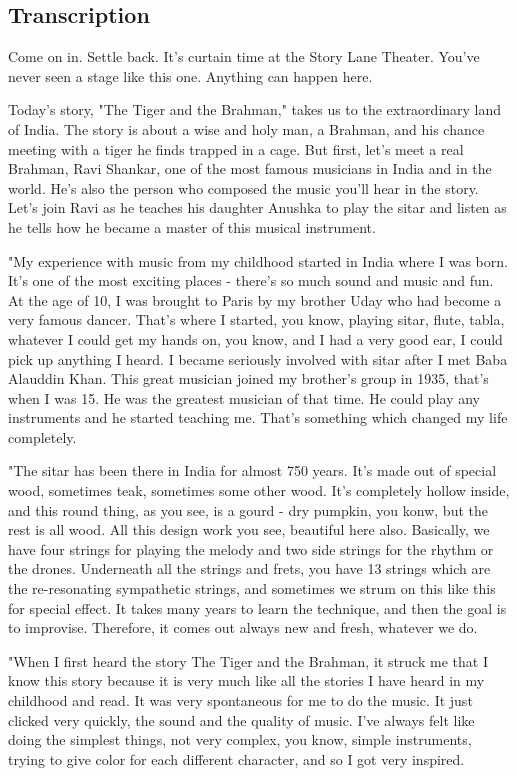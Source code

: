\subsection{Transcription}

Come on in. Settle back. It's curtain time at the Story Lane Theater. You've never seen a stage like this one. Anything can happen here.

Today's story, "The Tiger and the Brahman," takes us to the extraordinary land of India. The story is about a wise and holy man, a Brahman, and his chance meeting with a tiger he finds trapped in a cage. But first, let's meet a real Brahman, Ravi Shankar, one of the most famous musicians in India and in the world. He's also the person who composed the music you'll hear in the story. Let's join Ravi as he teaches his daughter Anushka to play the sitar and listen as he tells how he became a master of this musical instrument.

"My experience with music from my childhood started in India where I was born. It's one of the most exciting places - there's so much sound and music and fun. At the age of 10, I was brought to Paris by my brother Uday who had become a very famous dancer. That's where I started, you know, playing sitar, flute, tabla, whatever I could get my hands on, you know, and I had a very good ear, I could pick up anything I heard. I became seriously involved with sitar after I met Baba Alauddin Khan. This great musician joined my brother's group in 1935, that's when I was 15. He was the greatest musician of that time. He could play any instruments and he started teaching me. That's something which changed my life completely.

"The sitar has been there in India for almost 750 years. It's made out of special wood, sometimes teak, sometimes some other wood. It's completely hollow inside, and this round thing, as you see, is a gourd - dry pumpkin, you konw, but the rest is all wood. All this design work you see, beautiful here also. Basically, we have four strings for playing the melody and two side strings for the rhythm or the drones. Underneath all the strings and frets, you have 13 strings which are the re-resonating sympathetic strings, and sometimes we strum on this like this for special effect. It takes many years to learn the technique, and then the goal is to improvise. Therefore, it comes out always new and fresh, whatever we do.

"When I first heard the story The Tiger and the Brahman, it struck me that I know this story because it is very much like all the stories I have heard in my childhood and read. It was very spontaneous for me to do the music. It just clicked very quickly, the sound and the quality of music. I've always felt like doing the simplest things, not very complex, you know, simple instruments, trying to give color for each different character, and so I got very inspired.

